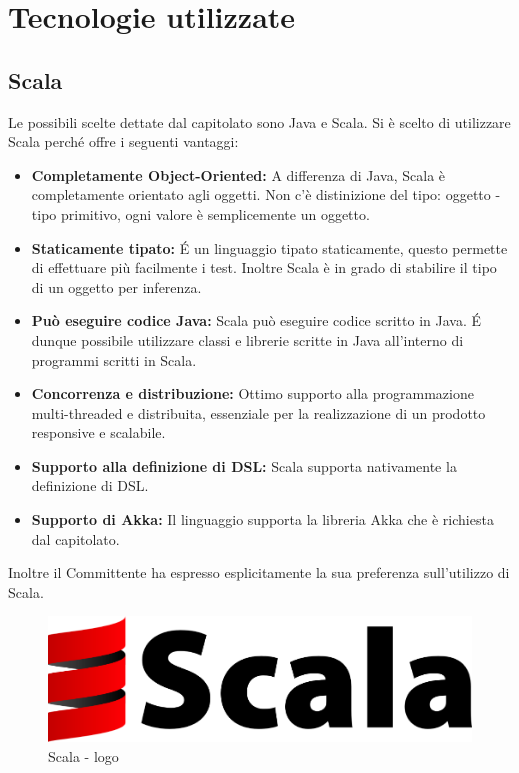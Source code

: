 \documentclass[a4paper]{article}
\begin{document}
		
	\newpage 
	\section{Tecnologie utilizzate}
	\subsection{Scala}
		Le possibili scelte dettate dal capitolato sono Java e Scala. Si è scelto di utilizzare Scala perché offre i seguenti vantaggi:
		\begin{itemize}
            \item \textbf{Completamente Object-Oriented:} A differenza di Java, Scala è completamente orientato agli oggetti. Non c'è distinizione del tipo: oggetto - tipo primitivo, ogni valore è semplicemente un oggetto.
			\item \textbf{Staticamente tipato:} \'E un linguaggio tipato staticamente, questo permette di effettuare più facilmente i test. Inoltre Scala è in grado di stabilire il tipo di un oggetto per inferenza.
            \item \textbf{Può eseguire codice Java:} Scala può eseguire codice scritto in Java. \'E dunque possibile utilizzare classi e librerie scritte in Java all'interno di programmi scritti in Scala. 
            \item \textbf{Concorrenza e distribuzione:} Ottimo supporto alla programmazione multi-threaded e distribuita, essenziale per la realizzazione di un prodotto responsive e scalabile.
			\item \textbf{Supporto alla definizione di DSL:} Scala supporta nativamente la definizione di DSL.
            \item \textbf{Supporto di Akka:} Il linguaggio supporta la libreria Akka che è richiesta dal capitolato.
		\end{itemize}
		Inoltre il Committente ha espresso esplicitamente la sua preferenza sull'utilizzo di Scala.
		\begin{figure} [H]
			\centering
			\includegraphics[scale=0.15]{immagini/ST/scala.png}
			\caption{Scala - logo}
		\end{figure}	
\end{document}
